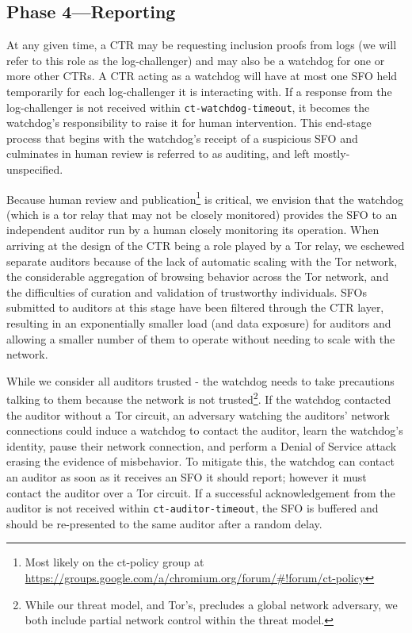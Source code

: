 \subsection{Phase 4---Reporting}

At any given time, a CTR may be requesting inclusion proofs from logs (we will refer to this role as the log-challenger) and may also be a watchdog for one or more other CTRs. A CTR acting as a watchdog will have at most one SFO held temporarily for each log-challenger it is interacting with. If a response from the log-challenger is not received within \texttt{ct-watchdog-timeout}, it becomes the watchdog's responsibility to raise it for human intervention. This end-stage process that begins with the watchdog's receipt of a suspicious SFO and culminates in human review is referred to as auditing, and left mostly-unspecified.

Because human review and publication\footnote{Most likely on the ct-policy group
at \url{https://groups.google.com/a/chromium.org/forum/\#!forum/ct-policy}} is critical, we envision that the watchdog (which is a tor relay that may not be closely monitored) provides the SFO to an independent auditor run by a human closely monitoring its operation. When arriving at the design of the CTR being a role played by a Tor relay, we eschewed separate auditors because of the lack of automatic scaling with the Tor network, the considerable aggregation of browsing behavior across the Tor network, and the difficulties of curation and validation of trustworthy individuals. SFOs submitted to auditors at this stage have been filtered through the CTR layer, resulting in an exponentially smaller load (and data exposure) for auditors and allowing a smaller number of them to operate without needing to scale with the network.

While we consider all auditors trusted - the watchdog needs to take precautions talking to them because the network is not trusted\footnote{While our threat model, and Tor's, precludes a global network adversary, we both include partial network control within the threat model.}. If the watchdog contacted the auditor without a Tor circuit, an adversary watching the auditors' network connections could induce a watchdog to contact the auditor, learn the watchdog's identity, pause their network connection, and perform a Denial of Service attack erasing the evidence of misbehavior. To mitigate this, the watchdog can contact an auditor as soon as it receives an SFO it should report; however it must contact the auditor over a Tor circuit. If a successful acknowledgement from the auditor is not received within \texttt{ct-auditor-timeout}, the SFO is buffered and should be re-presented to the same auditor after a random delay.

